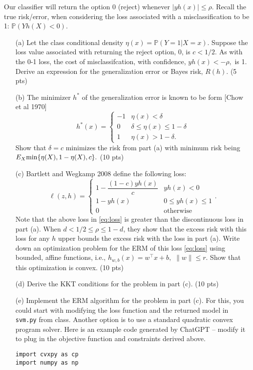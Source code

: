\documentclass[12pt]{article}
\begin{document}
Our classifier will return the option 0 (reject) whenever $|yh(x)| \leq \rho.$ Recall the true risk/error, when considering the loss associated with a misclassification to be 1: $\mathbb{P}(Y h(X) < 0)$.  


\begin{itemize}
	\item[(a)] Let the class conditional density $\eta(x) = \mathbb{P}(Y = 1|X = x).$ Suppose the loss value associated with returning the reject option, 0, is $c < 1/2.$ As with the 0-1 loss, the cost of misclassifcation, with confidence, $y h(x) < -\rho,$ is 1. Derive an expression for the generalization error or Bayes risk, $R(h)$.   (5 pts)

	\item[(b)] The minimizer $h^*$ of the generalization error is known to be form [Chow et al 1970]
	\begin{equation}
		h^*(x) = \begin{cases}
			-1 & \eta(x) < \delta \\
			0 & 	\delta \leq \eta(x) \leq 1-\delta \\
			1 & \eta(x) > 1 -\delta.
		\end{cases}
	\end{equation}
	Show that $\delta = c$ minimizes the risk from part (a) with minimum risk being $E_X {\rm min}\{\eta(X), 1- \eta(X), c\}.$ (10 pts)
\item[(c)] Bartlett and Wegkamp 2008 define the following loss:
	\begin{equation}
		\label{eq:loss}
		\ell(z, h) = \begin{cases}
			1 - \dfrac{(1-c)yh(x)}{c} & yh(x) < 0 \\
			1 - yh(x) & 0\leq yh(x) \leq 1 \\
			0 & \text{otherwise}
		\end{cases}.
	\end{equation}
Note that the above loss in \eqref{eq:loss} is greater than the discontinuous loss in part (a). When $d < 1/2 \leq \rho \leq 1-d$, they show that the excess risk with this loss for any $h$ upper bounds the excess risk with the loss in part (a). Write down an optimization problem for the ERM of this loss \eqref{eq:loss} using bounded, affine functions, i.e., $h_{w,b}(x) = w^\top x + b,$ $\|w\| \leq r.$ Show that this optimization is convex. (10 pts)
\item[(d)] Derive the KKT conditions for the problem in part (c). (10 pts)
\item[(e)] Implement the ERM algorithm for the problem in part (c). For this, you could start with modifying the loss function and the returned model in \verb+svm.py+ from class. Another option is to use a standard quadratic convex program solver. Here is an example code generated by ChatGPT -- modify it to plug in the objective function and constraints derived above.
\begin{lstlisting}
import cvxpy as cp
import numpy as np


\end{lstlisting}
\end{itemize}
\end{document}
